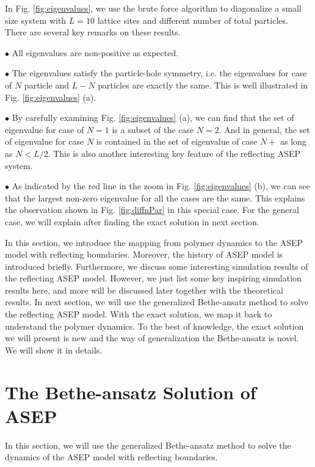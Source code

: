 In Fig. \ref{fig:eigenvalues}, we use the brute force algorithm to diagonalize a small size system with $L=10$ lattice sites and different number of total particles. There are several key remarks on these results.

$\bullet$ All eigenvalues are non-positive as expected. 

$\bullet$ The eigenvalues satisfy the particle-hole symmetry, i.e. the eigenvalues for case of $N$ particle and $L-N$ particles are exactly the same. This is well illustrated in Fig. \ref{fig:eigenvalues} (a). 

$\bullet$ By carefully examining Fig. \ref{fig:eigenvalues} (a), we can find that the set of eigenvalue for case of $N=1$ is a subset of the case $N=2$. And in general, the set of eigenvalue for case $N$ is contained in the set of eigenvalue of case $N+$ as long as $N<L/2$. This is also another interesting key feature of the reflecting ASEP system.

$\bullet$ As indicated by the red line in the zoom in Fig. \ref{fig:eigenvalues} (b), we can see that the largest non-zero eigenvalue for all the cases are the same. This explains the observation shown in Fig. \ref{fig:diffnPar} in this special case. For the general case, we will explain after finding the exact solution in next section.

In this section, we introduce the mapping from polymer dynamics to the ASEP model with reflecting boundaries. Moreover, the history of ASEP model is introduced briefly. Furthermore, we discuss some interesting simulation results of the reflecting ASEP model. However, we just list some key inspiring simulation results here, and more will be discussed later together with the theoretical results. 
In next section, we will use the generalized Bethe-ansatz method to solve the reflecting ASEP model. With the exact solution, we map it back to understand the polymer dynamics. To the best of knowledge, the exact solution we will present is new and the way of generalization the Bethe-ansatz is novel. We will show it in details. 



\section{The Bethe-ansatz Solution of ASEP}
\label{sec:the_bethe_ansatz_solution_of_asep}
In this section, we will use the generalized Bethe-ansatz method to solve the dynamics of the ASEP model with reflecting boundaries. 

